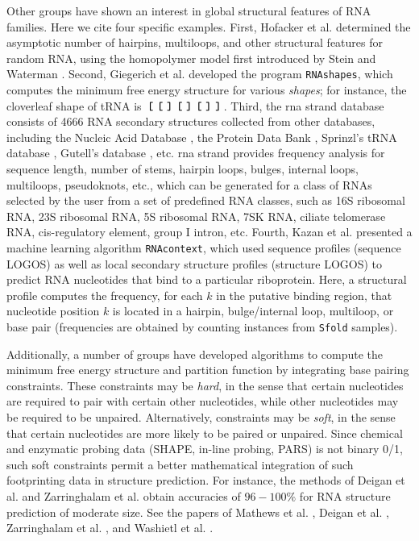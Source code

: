 Other groups have shown an interest in global structural features
of RNA families. Here we cite four specific examples.
First, Hofacker et al.  \citep{hofacker99a} determined the asymptotic
number of hairpins, multiloops, and other structural features for
random RNA, using the homopolymer model first introduced by
Stein and Waterman \citep{steinWaterman}.
Second, Giegerich et al. \citep{giegerich:shapesBioinf} developed the
program {\tt RNAshapes}, which computes the minimum free energy structure
for various {\em shapes}; for instance, the cloverleaf shape of tRNA is
$\,\mbox{\bf\texttt{[}}\, \,\mbox{\bf\texttt{[}}\, \,\mbox{\bf\texttt{]}}\, \,\mbox{\bf\texttt{[}}\, \,\mbox{\bf\texttt{]}}\, \,\mbox{\bf\texttt{[}}\, \,\mbox{\bf\texttt{]}}\, \,\mbox{\bf\texttt{]}}\,$.
Third, the {\sc rna strand} database \citep{Andronescu.bb08}
consists of 4666 RNA secondary
structures collected from other databases, including
the Nucleic Acid Database \citep{berman03}, the Protein Data Bank
\citep{Berman.acdb02}, Sprinzl's tRNA database
\citep{sprinzl}, Gutell's database \citep{gutell:ribosomalRNA}, etc.
{\sc rna strand} provides frequency analysis for sequence length,
number of stems, hairpin loops, bulges, internal loops, multiloops,
pseudoknots, etc., which can be generated for a
class of RNAs selected by the user from a set of predefined RNA classes,
such as 16S ribosomal RNA, 23S ribosomal RNA, 5S ribosomal RNA,
7SK RNA, ciliate telomerase RNA, cis-regulatory element, group I intron,
etc.
Fourth, Kazan et al. \citep{Kazan.pcb10} presented a machine learning
algorithm {\tt RNAcontext}, which used sequence profiles (sequence LOGOS)
as well as local secondary structure profiles (structure LOGOS) to
predict RNA nucleotides that bind to a particular riboprotein. Here,
a structural profile computes the frequency, for each $k$ in the putative
binding region,  that nucleotide position $k$ is located in a hairpin,
bulge/internal loop, multiloop, or base pair (frequencies are obtained
by counting instances from {\tt Sfold} samples).

Additionally, a number of groups have developed
algorithms to compute the minimum free energy structure and
partition function by integrating base pairing constraints.
These constraints may be {\em hard}, in the sense that
certain nucleotides are required to pair with certain other
nucleotides, while other nucleotides may be required to be unpaired.
Alternatively, constraints may be {\em soft}, in the sense that
certain nucleotides are more likely to be paired or unpaired.
Since chemical and enzymatic probing data (SHAPE, in-line probing,
PARS) is not binary 0/1, such soft constraints permit a better
mathematical integration of such footprinting data in structure
prediction. For instance, the methods of Deigan et al.  \citep{Deigan.pnas09}
and Zarringhalam et al.  \citep{Zarringhalam.po12} obtain accuracies
of $96-100\%$ for RNA structure prediction of moderate size.
See the papers of  Mathews et al.  \citep{mathewsConstraints},
Deigan et al. \citep{Deigan.pnas09},
Zarringhalam et al. \citep{Zarringhalam.po12}, and
Washietl et al. \citep{Washietl.nar12}.


